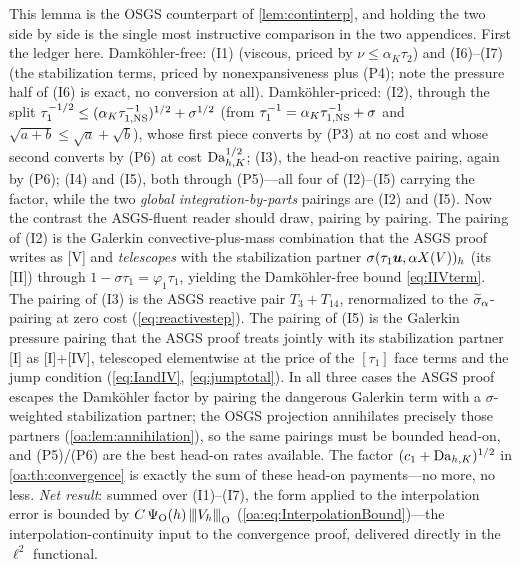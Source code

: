 \begin{pedagogy}
This lemma is the OSGS counterpart of \cref{lem:continterp}, and holding the
two side by side is the single most instructive comparison in the two
appendices. First the ledger here. Damk\"ohler-free: (I1) (viscous, priced by
$\nu \le \alpha_K\tau_2$) and (I6)--(I7) (the stabilization terms, priced by
nonexpansiveness plus (P4); note the pressure half of (I6) is exact, no
conversion at all). Damk\"ohler-priced: (I2), through the split
$\tau_1^{-1/2} \le (\alpha_K\tau_{1,\mathrm{NS}}^{-1})^{1/2} + \sigma^{1/2}$ (from
$\tau_1^{-1} = \alpha_K\tau_{1,\mathrm{NS}}^{-1}+\sigma$ and $\sqrt{a+b} \le \sqrt a + \sqrt
b$), whose first piece converts by (P3) at no cost and whose second converts by
(P6) at cost $\mathrm{Da}_{h,K}^{1/2}$; (I3), the head-on reactive pairing, again by (P6);
(I4) and (I5), both through (P5)---all four of (I2)--(I5) carrying the factor, while the
two \emph{global integration-by-parts} pairings are (I2) and (I5).
Now the contrast the ASGS-fluent reader should draw, pairing by pairing. The
pairing of (I2) is the Galerkin convective-plus-mass combination that the ASGS
proof writes as [V] and \emph{telescopes} with the stabilization partner
$\sigma(\tau_1\boldsymbol{u}, \alpha X(V))_h$ (its [II]) through
$1-\sigma\tau_1 = \varphi_1\tau_1$, yielding the Damk\"ohler-free bound
\cref{eq:IIVterm}. The pairing of (I3) is the ASGS reactive pair
$T_3 + T_{14}$, renormalized to the $\widetilde{\sigma}_{\alpha}$-pairing at zero cost
(\cref{eq:reactivestep}). The pairing of (I5) is the Galerkin pressure pairing
that the ASGS proof treats jointly with its stabilization partner [I] as
[I]+[IV], telescoped elementwise at the price of the $[\tau_1]$ face terms and
the jump condition (\cref{eq:IandIV}, \cref{eq:jumptotal}). In all three cases
the ASGS proof escapes the Damk\"ohler factor by pairing the dangerous Galerkin
term with a $\sigma$-weighted stabilization partner; the OSGS projection
annihilates precisely those partners (\cref{oa:lem:annihilation}), so the same
pairings must be bounded head-on, and (P5)/(P6) are the best head-on rates
available. The factor $(c_1+\mathrm{Da}_{h,K})^{1/2}$ in \cref{oa:th:convergence} is exactly
the sum of these head-on payments---no more, no less.
\emph{Net result}: summed over (I1)--(I7), the form applied to the interpolation
error is bounded by $C\,\Psi_{\mathrm O}(h)\,{\lvert\kern-0.25ex\lvert\kern-0.25ex\lvert V_h \rvert\kern-0.25ex\rvert\kern-0.25ex\rvert}_{\mathrm O}$
(\cref{oa:eq:InterpolationBound})---the interpolation-continuity input to the
convergence proof, delivered directly in the $\ell^2$ functional.
\end{pedagogy}

